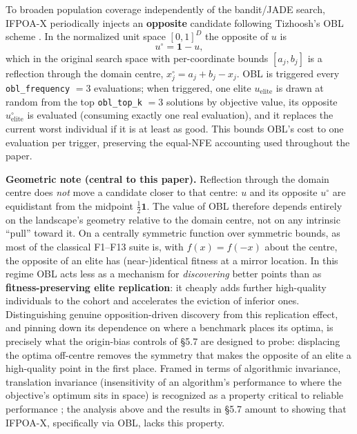 \documentclass[preprint,12pt]{elsarticle}
\begin{document}
To broaden population coverage independently of the bandit/JADE search, IFPOA-X periodically injects an \textbf{opposite} candidate following Tizhoosh's OBL scheme \cite{tizhoosh2005opposition}. In the normalized unit space $[0,1]^D$ the opposite of $u$ is
\begin{equation}
u^{\circ} = \mathbf{1} - u,
\label{eq:obl}
\end{equation}
which in the original search space with per-coordinate bounds $[a_j, b_j]$ is a reflection through the domain centre, $x_j^{\circ} = a_j + b_j - x_j$. OBL is triggered every \texttt{obl\_frequency} $=3$ evaluations; when triggered, one elite $u_{\text{elite}}$ is drawn at random from the top \texttt{obl\_top\_k} $=3$ solutions by objective value, its opposite $u^{\circ}_{\text{elite}}$ is evaluated (consuming exactly one real evaluation), and it replaces the current worst individual if it is at least as good. This bounds OBL's cost to one evaluation per trigger, preserving the equal-NFE accounting used throughout the paper.

\textbf{Geometric note (central to this paper).} Reflection through the domain centre does \emph{not} move a candidate closer to that centre: $u$ and its opposite $u^{\circ}$ are equidistant from the midpoint $\tfrac{1}{2}\mathbf{1}$. The value of OBL therefore depends entirely on the landscape's geometry relative to the domain centre, not on any intrinsic ``pull'' toward it. On a centrally symmetric function over symmetric bounds, as most of the classical F1--F13 suite is, with $f(x)=f(-x)$ about the centre, the opposite of an elite has (near-)identical fitness at a mirror location. In this regime OBL acts less as a mechanism for \emph{discovering} better points than as \textbf{fitness-preserving elite replication}: it cheaply adds further high-quality individuals to the cohort and accelerates the eviction of inferior ones. Distinguishing genuine opposition-driven discovery from this replication effect, and pinning down its dependence on where a benchmark places its optima, is precisely what the origin-bias controls of \S5.7 are designed to probe: displacing the optima off-centre removes the symmetry that makes the opposite of an elite a high-quality point in the first place. Framed in terms of algorithmic invariance, translation invariance (insensitivity of an algorithm's performance to where the objective's optimum sits in space) is recognized as a property critical to reliable performance \cite{wang2024multidirection}; the analysis above and the results in \S5.7 amount to showing that IFPOA-X, specifically via OBL, lacks this property.
\end{document}
